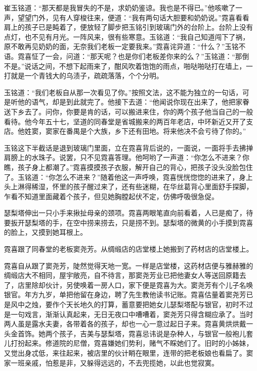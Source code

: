 \par 崔玉铭道：“那天都是我冒失的不是，求奶奶鉴谅。我也是不得已。”他咳嗽了一声，望望门外，见有人穿梭往来，便道：“我有两句话大胆要和奶奶说。”霓喜看看肩上的孩子已是盹着了，便放轻了脚步把玉铭引到玻璃门外的台阶上。台阶上没有点灯，也不见有月光。一阵风来，很有些寒意。玉铭道：“我自己知道闯下了祸，原不敢再见奶奶的面，无奈我们老板一定要我来。”霓喜诧异道：“什么？”玉铭不语。霓喜怔了一会，问道：“那天呢？也是你们老板差你来的么？”玉铭道：“那倒不是。”说话之间，不想下起雨来了，酣风吹着饱饱的雨点，啪哒啪哒打在墙上，一打就是一个青钱大的乌渍子，疏疏落落，个个分明。
\par 玉铭道：“我们老板自从那一次看见了你。”按照文法，这不能为独立的一句话，可是听他的语气，却是到此就完了。他接下去道：“他闻说你现在出来了，他把家眷送下乡去了。问你，你要是肯的话，可以搬进来住，你的两个孩子他当自己的一般看待。他今年五十七，坚道的同春堂是省城搬来的两百年老店，中环新近又开了支店。他姓窦，窦家在番禺是个大族，乡下还有田地。将来他决不会亏待了你的。”
\par 玉铭这下半截话是退到玻璃门里面，立在霓喜背后说的，一面说，一面将手去拂掸肩膀上的水珠子。说罢，只不见霓喜答理。他呵哟了一声道：“你怎么不进来？你瞧，孩子身上都潮了。”霓喜摸摸孩子衣服，解开自己的背心，把孩子没头没脸包住了。玉铭道：“你怎么不进来？”随着他这一声呼唤，霓喜恍恍惚惚的进来了，身上头上淋得稀湿，怀里的孩子醒过来了，还有些迷糊，在华丝葛背心里面舒手探脚，乍看不知道里面藏着个孩子，但见她胸膛起伏不定，仿佛呼吸很急促。
\par 瑟梨塔伸出一只小手来揪扯母亲的颈项。霓喜两眼笔直向前看着，人已是痴了，待要扳开瑟梨塔的手，在空中捞来捞去，只是捞不到。瑟梨塔的微黄的小手摸到霓喜的脸上，又摸到她耳根上。
\par 霓喜跟了同春堂的老板窦尧芳。从绸缎店的店堂楼上她搬到了药材店的店堂楼上。
\par 霓喜自从跟了窦尧芳，陡然觉得天地一宽。一样是店堂楼，这药材店便与雅赫雅的绸缎店大不相同，屋宇敞亮，自不待言，那窦尧芳业已把他妻女人等送回原籍去了，店里除却伙计，另使唤着一房人口，家下便是霓喜为大。窦尧芳有个儿子名唤银官。年方九岁，单把他留在身边，聘了先生教他读书记账。霓喜估量着窦尧芳已是风中之烛，要作个天长地久的打算，蓄意要把她女儿瑟梨塔配与银官，初时不过是一句戏言，渐渐认真起来，无日无夜口中嘈嘈着，窦尧芳只得含糊应承了。当时两人虽是露水夫妻，各带着各的孩子，却也一心一意过起日子来。霓喜黄烘烘戴一头金首饰。她两个孩子，吉美与瑟梨塔，霓喜忌讳说是杂种人，与银官一般袍儿套儿打扮起来。修道院的尼僧，霓喜嫌她们势利，赌气不睬她们了。旧时的小姊妹，又觉出身忒低，来往起来，被店里的伙计睄在眼里，连带的把老板娘也看扁了。窦家一班亲戚，怕惹是非，又躲得远远的，不去兜揽她，以此也觉寂寞。
